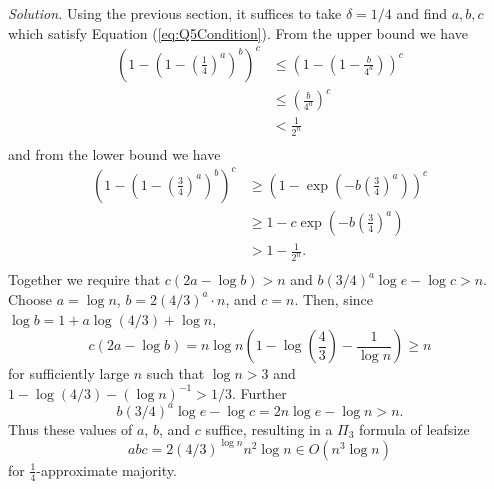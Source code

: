 \documentclass[11pt]{article}
\begin{document}
\begin{enumerate}
\emph{Solution.} Using the previous section, it suffices to take $\delta = 1/4$ and find $a,b,c$ which satisfy Equation (\ref{eq:Q5Condition}). From the upper bound we have 
\begin{align*}
	\left(1 - \left(1 - \left(\frac{1}{4}\right)^a\right)^b\right)^c &\leq \left(1 - \left(1 - \frac{b}{4^a}\right)\right)^c\\
	&\leq \left(\frac{b}{4^a}\right)^c\\ 
	&< \frac{1}{2^n}\\
\end{align*}
and from the lower bound we have
\begin{align*}
	\left(1 - \left(1 - \left(\frac{3}{4}\right)^a\right)^b\right)^c &\geq \left(1 - \exp\left(-b\left(\frac{3}{4}\right)^a\right)\right)^c\\
	&\geq 1 - c\exp\left(-b\left(\frac{3}{4}\right)^a\right)\\
	&> 1 - \frac{1}{2^n}.\\
\end{align*}
Together we require that $c\left(2a - \log b\right) > n$ and $b\left(3/4\right)^{a}\log e - \log c > n$. Choose $a = \log n$, $b = 2(4/3)^{a}\cdot n$, and $c = n$. Then, since $\log b = 1 + a\log \left(4/3\right) + \log n$,
\[c\left(2a - \log b\right) = n\log n \left(1 - \log \left(\frac{4}{3}\right) - \frac{1}{\log n}\right) \geq n\]
for sufficiently large $n$ such that $\log n > 3$ and $1 - \log \left(4/3\right) - (\log n)^{-1} > 1/3$. Further
\[b\left(3/4\right)^{a}\log e - \log c = 2n\log e - \log n > n.\]
Thus these values of $a$, $b$, and $c$ suffice, resulting in a $\Pi_3$ formula of leafsize 
\[abc = 2(4/3)^{\log n}n^2\log n \in O(n^3\log n)\] 
for $\frac{1}{4}$-approximate majority.
\end{enumerate}
\end{document}
